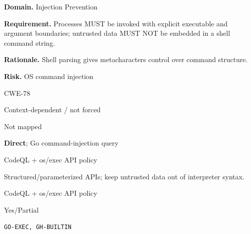 \documentclass[10pt,letterpaper]{article}
\newcommand{\prioritybadge}[2]{\tcbox[on line,boxrule=0pt,arc=1.2mm,boxsep=0.7mm,left=1mm,right=1mm,top=0.4mm,bottom=0.4mm,colback=#2!12,coltext=#2]{\scriptsize\bfseries #1}}
\begin{document}
\begin{rulebox}[title={\texttt{SCS-GO-INJ-001} \hfill \prioritybadge{Critical Control}{Critical}}]
\textbf{Domain.} Injection Prevention

\textbf{Requirement.} Processes MUST be invoked with explicit executable and argument boundaries; untrusted data MUST NOT be embedded in a shell command string.

\textbf{Rationale.} Shell parsing gives metacharacters control over command structure.

\textbf{Risk.} OS command injection

\begin{description}[leftmargin=2.65cm,labelwidth=2.3cm,style=nextline,itemsep=1pt,topsep=3pt]
  \item[CWE] CWE-78
  \item[OWASP] Context-dependent / not forced
  \item[CERT] Not mapped
  \item[CodeQL] \textbf{Direct}; Go command-injection query
  \item[Enforcement] CodeQL + os/exec API policy
  \item[Prevention] Structured/parameterized APIs; keep untrusted data out of interpreter syntax.
  \item[Verification] CodeQL + os/exec API policy
  \item[Automation] Yes/Partial
  \item[Sources] \texttt{GO-EXEC, GH-BUILTIN}
\end{description}
\end{rulebox}
\end{document}

